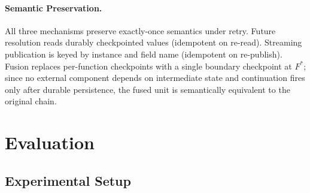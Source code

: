 \documentclass[runningheads]{llncs}
\begin{document}
\paragraph{Semantic Preservation.}
All three mechanisms preserve exactly-once semantics under retry. Future resolution reads durably checkpointed values (idempotent on re-read). Streaming publication is keyed by instance and field name (idempotent on re-publish). Fusion replaces per-function checkpoints with a single boundary checkpoint at $F^{*}$; since no external component depends on intermediate state and continuation fires only after durable persistence, the fused unit is semantically equivalent to the original chain.



\section{Evaluation}
\label{sec:evaluation}

\subsection{Experimental Setup}
\end{document}
